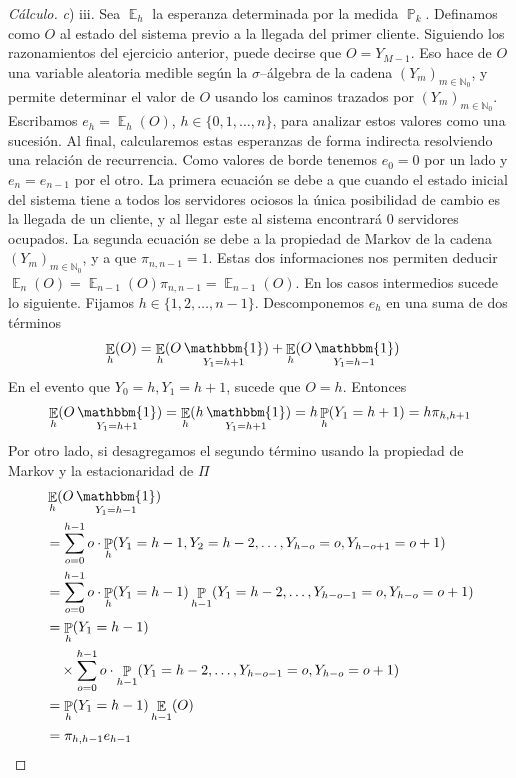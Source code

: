 \documentclass{article}
\DeclareMathOperator{\prob}{\mathbb{P}}
\DeclareMathOperator{\Expectation}{\mathbb{E}}
\DeclareMathOperator{\characteristic}{\mathbbm{1}}
\newcommand{\naturalnum}{\mathbb{N}}
\theoremstyle{definition}
\begin{document}
\begin{proof}[Cálculo] \textit{c}) iii.
Sea \(\Expectation_h\) la esperanza determinada por la medida \(\prob_k\).
Definamos como \(O\) al estado del sistema previo a la llegada del primer cliente.
Siguiendo los razonamientos del ejercicio anterior, puede decirse que \(O = Y_{M - 1}\).
Eso hace de \(O\) una variable aleatoria medible según la \(\sigma\)--álgebra de la cadena \((Y_m)_{m \in \naturalnum_0}\), y permite determinar el valor de \(O\) usando los caminos trazados por \((Y_m)_{m \in \naturalnum_0}\).
Escribamos \(e_h = \Expectation_h(O)\), \(h \in \{0, 1, \dots, n\}\), para analizar estos valores como una sucesión.
Al final, calcularemos estas esperanzas de forma indirecta resolviendo una relación de recurrencia.
Como valores de borde tenemos \(e_0 = 0\) por un lado y \(e_n = e_{n - 1}\) por el otro.
La primera ecuación se debe a que cuando el estado inicial del sistema tiene a todos los servidores ociosos la única posibilidad de cambio es la llegada de un cliente, y al llegar este al sistema encontrará 0 servidores ocupados.
La segunda ecuación se debe a la propiedad de Markov de la cadena \((Y_m)_{m \in \naturalnum_0}\), y a que \(\pi_{n, n - 1} = 1\).
Estas dos informaciones nos permiten deducir \(\Expectation_n(O) = \Expectation_{n - 1}(O) \pi_{n, n - 1} = \Expectation_{n - 1}(O)\).
En los casos intermedios sucede lo siguiente.
Fijamos \(h \in \{1, 2, \dots, n - 1\}\).
Descomponemos \(e_h\) en una suma de dos términos
\begin{align}
	\Expectation_h(O)
	&=
	\Expectation_h(O \characteristic_{Y_1 = h + 1})
	+ \Expectation_h(O \characteristic_{Y_1 = h - 1})
\end{align}
En el evento que \(Y_0 = h, Y_1 = h + 1\), sucede que \(O = h\).
Entonces 
\begin{align}
	\Expectation_h(O \characteristic_{Y_1 = h + 1}) 
	= 
	\Expectation_h(h \characteristic_{Y_1 = h + 1}) 
	= 
	h \prob_h(Y_1 = h + 1) 
	= 
	h \pi_{h, h + 1}
\end{align}
Por otro lado, si desagregamos el segundo término usando la propiedad de Markov y la estacionaridad de \(\Pi\)
\begin{align}
	&\Expectation_h(O \characteristic_{Y_1 = h - 1}) 
	\\
	&= 
		\sum_{o = 0}^{h - 1} o \cdot \prob_h(Y_1 = h - 1, Y_2 = h - 2, \dots, Y_{h - o} = o, Y_{h - o + 1} = o + 1)
	\\
	&=
		\sum_{o = 0}^{h - 1} o \cdot \prob_h(Y_1 = h - 1) \prob_{h - 1}(Y_1 = h - 2, \dots, Y_{h - o - 1} = o, Y_{h - o} = o + 1)
	\\
	&=
		\prob_h(Y_1 = h - 1)
	\\
		&\hspace{1em} \times \sum_{o = 0}^{h - 1} o \cdot \prob_{h - 1}(Y_1 = h - 2, \dots, Y_{h - o - 1} = o, Y_{h - o} = o + 1)
	\\
	&=
		\prob_h(Y_1 = h - 1) \Expectation_{h - 1}(O)
	\\
	&=
		\pi_{h, h - 1} e_{h - 1}
\end{align}


\end{proof}
\end{document}
